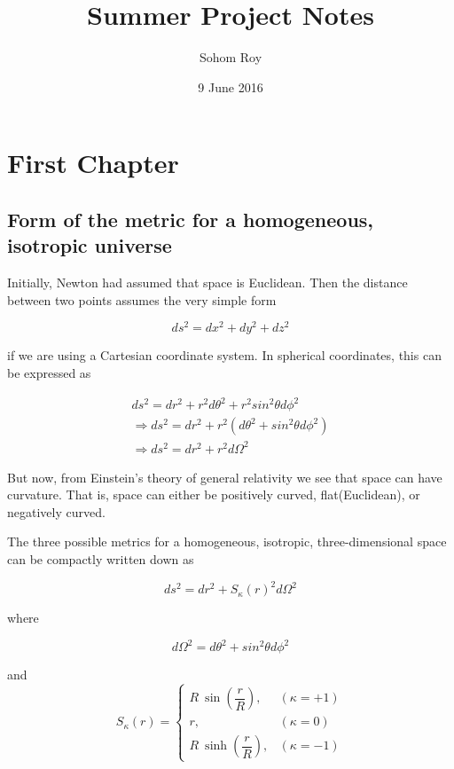 \documentclass[a4,10pt,oneside]{report}
\begin{document}
	\title{Summer Project Notes}
	\date{9 June 2016}
	\author{Sohom Roy}
	\maketitle
	
	
	\tableofcontents

	
	\chapter{First Chapter}
	
	\section{Form of the metric for a homogeneous, isotropic universe}
	
	Initially, Newton had assumed that space is Euclidean. Then the distance between two points assumes the very simple form
	
	\begin{equation}
		ds^2=dx^2+dy^2+dz^2
	\end{equation}
	
	if we are using a Cartesian coordinate system. In spherical coordinates, this can be expressed as

	\begin{eqnarray}
	ds^2=dr^2+ r^2d\theta^2 + r^2sin^2\theta d\phi^2	\\
	\Rightarrow ds^2=dr^2+ r^2(d\theta^2+sin^2\theta d\phi^2) \\
	\Rightarrow ds^2=dr^2+ r^2d\Omega^2 
	\end{eqnarray}
	
	But now, from Einstein's theory of general relativity we see that space can have curvature. That is, space can either be positively curved, flat(Euclidean), or negatively curved.
	
	The three possible metrics for a homogeneous, isotropic, three-dimensional space can be compactly written down as
	
	\begin{equation}
	    ds^2=dr^2+S_\kappa(r)^2d\Omega^2
	\end{equation}
	
	where 
	
	\begin{equation}
		d\Omega^2=d\theta^2+sin^2\theta d\phi^2
	\end{equation}
	
	and 
	\begin{equation}
		S_\kappa(r)=\begin{cases}R\:\sin\left(\dfrac{r}{R}\right),   &(\kappa=+1) \\
		r,  &(\kappa=0) \\
		R\:\sinh\left(\dfrac{r}{R}\right),  &(\kappa=-1)
		\end{cases}
	\end{equation}
	
\end{document}
